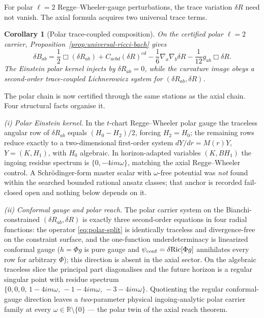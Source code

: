 \documentclass[11pt]{article}
\newtheorem{corollary}[theorem]{Corollary}
\theoremstyle{definition}
\theoremstyle{remark}
\newcommand{\R}{\mathbb R}
\begin{document}
For polar \(\ell=2\) Regge--Wheeler-gauge perturbations, the trace variation
\(\delta R\) need not vanish.  The axial formula acquires two universal
trace terms.

\begin{corollary}[Polar trace-coupled composition]
On the certified polar \(\ell=2\) carrier,
Proposition~\ref{prop:universal-ricci-bach} gives
\begin{equation}\label{eq:polar-split}
 \boxed{
 \delta B_{ab}=\frac12\Box(\delta R_{ab})
 +C_{acbd}(\delta R)^{cd}
 -\frac16\nabla_a\nabla_b\delta R
 -\frac1{12}g_{ab}\Box\delta R.}
\end{equation}
The Einstein polar kernel injects by \(\delta R_{ab}=0\), while the curvature
image obeys a second-order trace-coupled Lichnerowicz system for
\((\delta R_{ab},\delta R)\).
\end{corollary}

The polar chain is now certified through the same stations as the axial
chain.  Four structural facts organise it.

\emph{(i) Polar Einstein kernel.}  In the \(t\)-chart Regge--Wheeler polar
gauge the traceless angular row of \(\delta R_{ab}\) equals
\((H_0-H_2)/2\), forcing \(H_2=H_0\); the remaining rows reduce exactly to
a two-dimensional first-order system \(dY/dr=M(r)Y\), \(Y=(K,H_1)\), with
\(H_0\) algebraic.  In horizon-adapted variables \((K,BH_1)\) the ingoing
residue spectrum is \(\{0,-4im\omega\}\), matching the axial
Regge--Wheeler control.  A Schr\"odinger-form master scalar with
\(\omega\)-free potential was \emph{not} found within the searched bounded
rational ansatz classes; that anchor is recorded fail-closed open and
nothing below depends on it.

\emph{(ii) Conformal gauge and polar reach.}  The polar carrier system on
the Bianchi-constrained \((\delta R_{ab},\delta R)\) is exactly three
second-order equations in four radial functions: the operator
\eqref{eq:polar-split} is identically traceless and divergence-free on the
constraint surface, and the one-function underdeterminacy is linearized
conformal gauge (\(h=\Phi g\) is pure gauge and
\(\psi_{\rm conf}=\delta\mathrm{Ric}[\Phi g]\) annihilates every row for
arbitrary \(\Phi\)); this direction is absent in the axial sector.  On the
algebraic traceless slice the principal part diagonalises and the future
horizon is a regular singular point with residue spectrum
\(\{0,0,0,\,1-4im\omega,\,-1-4im\omega,\,-3-4im\omega\}\).  Quotienting the
regular conformal-gauge direction leaves a \emph{two}-parameter physical
ingoing-analytic polar carrier family at every
\(\omega\in\R\setminus\{0\}\) --- the polar twin of the axial reach
theorem.
\end{document}
